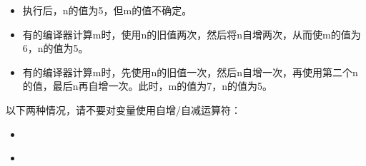 \begin{frame}[fragile]
\begin{itemize}
\item 执行后，n的值为5，但m的值不确定。\\[0.1in]
\item 有的编译器计算m时，使用n的旧值两次，然后将n自增两次，从而使m的值为6，n的值为5。\\[0.1in]
\item 有的编译器计算m时，先使用n的旧值一次，然后n自增一次，再使用第二个n的值，最后n再自增一次。此时，m的值为7，n的值为5。
\end{itemize}
\end{frame}

\begin{frame}[fragile]

  以下两种情况，请不要对变量使用自增/自减运算符：\\[0.1in]
\begin{itemize}
\item {}\\[0.1in]
\item {}
\end{itemize}
\end{frame}
